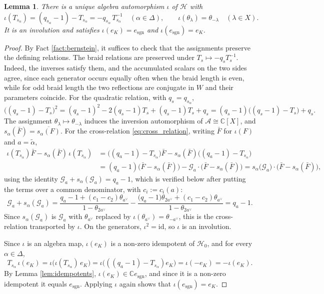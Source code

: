 \documentclass[12pt]{article}
\numberwithin{equation}{section}
\newtheorem{lemma}[theorem]{Lemma}
\theoremstyle{definition}
\theoremstyle{remark}
\theoremstyle{plain}
\begin{document}
\begin{lemma}\label{lem:IM}
There is a unique algebra automorphism $\iota$ of $\mathcal{H}$ with
$$\iota(T_{s_\alpha}) = (q_{s_\alpha}-1) - T_{s_\alpha} = -q_{s_\alpha}\,T_{s_\alpha}^{-1} \quad (\alpha \in \Delta), \qquad \iota(\theta_\lambda) = \theta_{-\lambda} \quad (\lambda \in X).$$
It is an involution and satisfies $\iota(e_K) = e_{\mathrm{sgn}}$ and $\iota(e_{\mathrm{sgn}}) = e_K$.
\end{lemma}
\begin{proof}
By Fact \ref{fact:bernstein}, it suffices to check that the assignments preserve the defining relations. The braid relations are preserved under $T_{s} \mapsto -q_sT_{s}^{-1}$. Indeed, the inverses satisfy them, and the accumulated scalars on the two sides agree, since each generator occurs equally often when the braid length is even, while for odd braid length the two reflections are conjugate in $W$ and their parameters coincide. For the quadratic relation, with $q_s = q_{s_\alpha}$,
$$\big((q_s-1) - T_s\big)^2 = (q_s-1)^2 - 2(q_s-1)T_s + (q_s-1)T_s + q_s = (q_s-1)\big((q_s-1) - T_s\big) + q_s.$$
The assignment $\theta_\lambda \mapsto \theta_{-\lambda}$ induces the inversion automorphism of $\mathcal{A} \cong \mathbb{C}[X]$, and $s_\alpha(\bar{F}) = \overline{s_\alpha(F)}$. For the cross-relation \eqref{eq:cross_relation}, writing $\bar{F}$ for $\iota(F)$ and $a = \tilde\alpha$,
\begin{align*}
\iota(T_{s_\alpha})\bar{F} - s_\alpha(\bar{F})\,\iota(T_{s_\alpha})
&= \big((q_a-1) - T_{s_\alpha}\big)\bar{F} - s_\alpha(\bar{F})\big((q_a-1) - T_{s_\alpha}\big) \\
&= (q_a-1)\big(\bar{F} - s_\alpha(\bar{F})\big) - \mathcal{G}_a\cdot\big(\bar{F} - s_\alpha(\bar{F})\big)
= s_\alpha\big(\mathcal{G}_a\big)\cdot\big(\bar{F} - s_\alpha(\bar{F})\big),
\end{align*}
using the identity $\mathcal{G}_a + s_\alpha(\mathcal{G}_a) = q_a - 1$, which is verified below after putting the terms over a common denominator, with $c_i:=c_i(a)$:
$$\mathcal{G}_a + s_\alpha(\mathcal{G}_a) = \frac{q_a - 1 + (c_1-c_2)\theta_{a^\vee}}{1-\theta_{2a^\vee}} - \frac{\big(q_a - 1\big)\theta_{2a^\vee} + (c_1-c_2)\theta_{a^\vee}}{1-\theta_{2a^\vee}} = q_a - 1.$$
Since $s_\alpha(\mathcal{G}_a)$ is $\mathcal{G}_a$ with $\theta_{a^\vee}$ replaced by $\iota(\theta_{a^\vee}) = \theta_{-a^\vee}$, this is the cross-relation transported by $\iota$. On the generators, $\iota^2 = \mathrm{id}$, so $\iota$ is an involution.

Since $\iota$ is an algebra map, $\iota(e_K)$ is a non-zero idempotent of $\mathcal{H}_0$, and for every $\alpha \in \Delta$,
$$T_{s_\alpha}\,\iota(e_K) = \iota\big(\iota(T_{s_\alpha})\, e_K\big) = \iota\big(((q_a-1) - T_{s_\alpha})e_K\big) = \iota(-e_K) = -\iota(e_K).$$
By Lemma \ref{lem:idempotents}, $\iota(e_K) \in \mathbb{C}e_{\mathrm{sgn}}$, and since it is a non-zero idempotent it equals $e_{\mathrm{sgn}}$. Applying $\iota$ again shows that $\iota(e_{\mathrm{sgn}}) = e_K$.
\end{proof}
\end{document}
